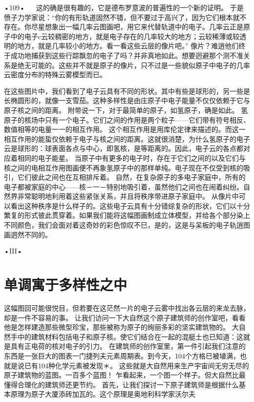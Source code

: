 •109•
  
这的确是很有趣的，它是德布罗意波的普遍性的一个新的证明。
于是愤子力学家说：“你的有形轨道固然不错，但不要过于高兴了，因为它们根本就不存在。你尽星想象出一幅几率云图画吧，用它来代替轨道中的电子。几率云正是原子中的电子c云较稠密的地方，就是电子存在的几率较大的地方；云较稀薄或较透明的地方，就是几率较小的地方。看一看这些云层的像片吧。”
像片？难逍他们终于成功地捕获到这些行踪飘忽的电子了吗？并非真地如此。想要迥避那个测不准关系是绝无可能的。这些并不就是原子的像片，只不过是一些貌似原子中电子的几率云密度分布的特殊云雾模型而已。

在这些图片中，我们看到了电子云具有不同的形状。其中有些是球形的，另一些是长椭圆形的，就像一支雪茄。这种多样性是由庄原子中电子能量不仅仅依赖于它与原子核之间的距离。
附带说一下，对于最简单的原子，如氢原子，确是如此。
氢原子的核场中只有一个电子。它们之间的作用是两个粒子——它们带有符号相反、数值相等的电量一一的相互作用。
这个相互作用是用库伦定律来描述的。而这一相互作用的能蜇仅依赖于电子与核之间的距离。这就很消楚，为什么氢原子的电子云是球形的：球表面各点与中心，即氢核，是等距离的。因此，电子云的各点都对应着相同的电子能星。
当原子中有更多的电子时，存在于它们之间的以及它们与核之间的电相互作用图画便不再象氢原子中的那样单纯。电子现在不仅受到核的吸引，它们彼此之间也在互相排斥着。
自然，在复杂原子的多电子家庭中，所有的电子都被家庭的中心——核－一－特别地吸引着，虽然他们之间也在闹着纠纷。自然界非常聪明地利用着这些紧张关系，并且将秩序带进原子家庭中。
从像片中可以看出这种秩序是什么样子的。这些电子云具有十分错综复杂的形状，它们以十分繁复的形式彼此贯穿着。如果我们能将这幅图画制成立体模型，并给各个部分染上不同颜色，我们会面对着这奇妙的彩色惊叹不巳，是的，这是与呆板的电子轨逍图画迵然不同的。

•III•
  
\section{单调寓于多样性之中}

这幅图回可能很悦目，但若要在这茫然一片的电子云雾中找出各云层的来龙去脉，却是一件不容易的事。
让我们访问一下大自然这个原子建筑师的创作室吧，看看他是怎样建造那些微型珍宝，那些被称为原子的绚丽多彩的坚实建筑物的。
大自然手中的建筑材料包括电子和原子核。使它们结合在一起的混艇土也已知道：这就是具有正电荷的核对电子的引力。
在建筑师的创作室里，第一件引起我们注意的东西是一张巨大的图表一门捷列夫元素周期表。到今天，104个方格巳被埴满，也就是说已有104种化学元素被发现＊。
这些就是大自然用来生产宇宙间无穷无尽的原子建筑物的蓝图。一百多个蓝图！
乍看起来，一个图一个样子。但大自然比最懂得合理化的建筑师还更节约。
首先，让我们探讨一下原子建筑师是根据什么基本原理为原子大厦添砖加瓦的。这个原理是奥地利科学家沃尔夫

